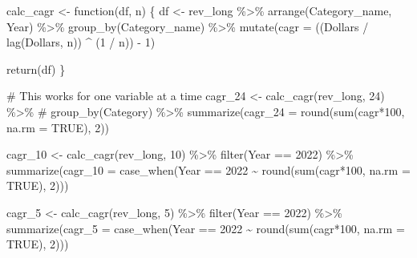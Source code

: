 \documentclass[
  letterpaper,
  DIV=11,
  numbers=noendperiod]{scrreport}
\newenvironment{Shaded}{\begin{snugshade}}{\end{snugshade}}
\newcommand{\AttributeTok}[1]{\textcolor[rgb]{0.40,0.45,0.13}{#1}}
\newcommand{\CommentTok}[1]{\textcolor[rgb]{0.37,0.37,0.37}{#1}}
\newcommand{\ConstantTok}[1]{\textcolor[rgb]{0.56,0.35,0.01}{#1}}
\newcommand{\ControlFlowTok}[1]{\textcolor[rgb]{0.00,0.23,0.31}{#1}}
\newcommand{\DecValTok}[1]{\textcolor[rgb]{0.68,0.00,0.00}{#1}}
\newcommand{\FunctionTok}[1]{\textcolor[rgb]{0.28,0.35,0.67}{#1}}
\newcommand{\NormalTok}[1]{\textcolor[rgb]{0.00,0.23,0.31}{#1}}
\newcommand{\OtherTok}[1]{\textcolor[rgb]{0.00,0.23,0.31}{#1}}
\newcommand{\SpecialCharTok}[1]{\textcolor[rgb]{0.37,0.37,0.37}{#1}}
\begin{document}
\begin{Shaded}
\begin{Highlighting}[]
\NormalTok{calc\_cagr }\OtherTok{\textless{}{-}} \ControlFlowTok{function}\NormalTok{(df, n) \{}
\NormalTok{  df }\OtherTok{\textless{}{-}}\NormalTok{ rev\_long }\SpecialCharTok{\%\textgreater{}\%}
    \FunctionTok{arrange}\NormalTok{(Category\_name, Year) }\SpecialCharTok{\%\textgreater{}\%}
    \FunctionTok{group\_by}\NormalTok{(Category\_name) }\SpecialCharTok{\%\textgreater{}\%}
    \FunctionTok{mutate}\NormalTok{(}\AttributeTok{cagr =}\NormalTok{ ((Dollars }\SpecialCharTok{/} \FunctionTok{lag}\NormalTok{(Dollars, n)) }\SpecialCharTok{\^{}}\NormalTok{ (}\DecValTok{1} \SpecialCharTok{/}\NormalTok{ n)) }\SpecialCharTok{{-}} \DecValTok{1}\NormalTok{)}

  \FunctionTok{return}\NormalTok{(df)}
\NormalTok{\}}

\CommentTok{\# This works for one variable at a time}
\NormalTok{cagr\_24 }\OtherTok{\textless{}{-}} \FunctionTok{calc\_cagr}\NormalTok{(rev\_long, }\DecValTok{24}\NormalTok{) }\SpecialCharTok{\%\textgreater{}\%} 
     \CommentTok{\# group\_by(Category) \%\textgreater{}\%}
  \FunctionTok{summarize}\NormalTok{(}\AttributeTok{cagr\_24 =} \FunctionTok{round}\NormalTok{(}\FunctionTok{sum}\NormalTok{(cagr}\SpecialCharTok{*}\DecValTok{100}\NormalTok{, }\AttributeTok{na.rm =} \ConstantTok{TRUE}\NormalTok{), }\DecValTok{2}\NormalTok{))}

\NormalTok{cagr\_10 }\OtherTok{\textless{}{-}} \FunctionTok{calc\_cagr}\NormalTok{(rev\_long, }\DecValTok{10}\NormalTok{) }\SpecialCharTok{\%\textgreater{}\%} 
  \FunctionTok{filter}\NormalTok{(Year }\SpecialCharTok{==} \DecValTok{2022}\NormalTok{) }\SpecialCharTok{\%\textgreater{}\%}
  \FunctionTok{summarize}\NormalTok{(}\AttributeTok{cagr\_10 =} \FunctionTok{case\_when}\NormalTok{(Year }\SpecialCharTok{==} \DecValTok{2022} \SpecialCharTok{\textasciitilde{}} \FunctionTok{round}\NormalTok{(}\FunctionTok{sum}\NormalTok{(cagr}\SpecialCharTok{*}\DecValTok{100}\NormalTok{, }\AttributeTok{na.rm =} \ConstantTok{TRUE}\NormalTok{), }\DecValTok{2}\NormalTok{)))}

\NormalTok{cagr\_5 }\OtherTok{\textless{}{-}} \FunctionTok{calc\_cagr}\NormalTok{(rev\_long, }\DecValTok{5}\NormalTok{) }\SpecialCharTok{\%\textgreater{}\%} 
  \FunctionTok{filter}\NormalTok{(Year }\SpecialCharTok{==} \DecValTok{2022}\NormalTok{) }\SpecialCharTok{\%\textgreater{}\%}
  \FunctionTok{summarize}\NormalTok{(}\AttributeTok{cagr\_5 =} \FunctionTok{case\_when}\NormalTok{(Year }\SpecialCharTok{==} \DecValTok{2022} \SpecialCharTok{\textasciitilde{}} \FunctionTok{round}\NormalTok{(}\FunctionTok{sum}\NormalTok{(cagr}\SpecialCharTok{*}\DecValTok{100}\NormalTok{, }\AttributeTok{na.rm =} \ConstantTok{TRUE}\NormalTok{), }\DecValTok{2}\NormalTok{)))}


\end{Highlighting}
\end{Shaded}
\end{document}
